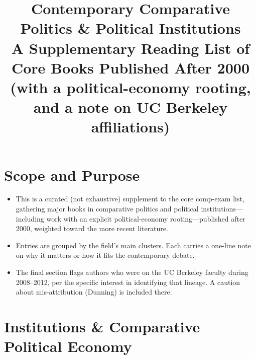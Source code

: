 \documentclass[12pt]{article}
\title{\textbf{Contemporary Comparative Politics \& Political Institutions}\\
\large A Supplementary Reading List of Core Books Published After 2000\\
(with a political-economy rooting, and a note on UC Berkeley affiliations)}
\author{}
\date{}
\begin{document}
\maketitle
\tableofcontents
\newpage

\section{Scope and Purpose}

\begin{itemize}[leftmargin=*, itemsep=4pt]
    \item This is a curated (not exhaustive) supplement to the core comp-exam list, gathering major books in comparative politics and political institutions---including work with an explicit political-economy rooting---published after 2000, weighted toward the more recent literature.
    \item Entries are grouped by the field's main clusters. Each carries a one-line note on why it matters or how it fits the contemporary debate.
    \item The final section flags authors who were on the UC Berkeley faculty during 2008--2012, per the specific interest in identifying that lineage. A caution about mis-attribution (Dunning) is included there.
\end{itemize}

\section{Institutions \& Comparative Political Economy}
\end{document}
